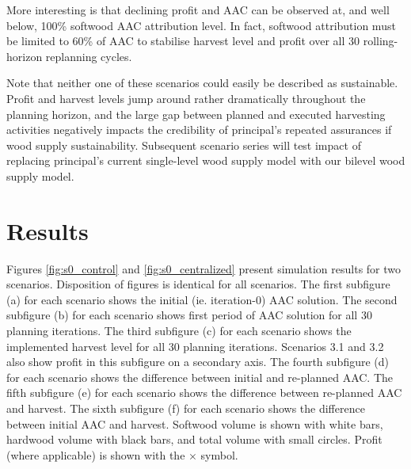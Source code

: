 More interesting is that declining profit and AAC can be observed at, and well below, 100\% softwood AAC attribution level. 
In fact, softwood attribution must be limited to 60\% of AAC to stabilise harvest level and profit over all 30 rolling-horizon replanning cycles.

Note that neither one of these scenarios could easily be described as sustainable. Profit and harvest levels jump around rather dramatically throughout the planning horizon, and the large gap between planned and executed harvesting activities negatively impacts the credibility of principal's repeated assurances if wood supply sustainability. Subsequent scenario series will test impact of replacing principal's current single-level wood supply model with our bilevel wood supply model. 

\section{Results}

Figures \ref{fig:s0_control} and \ref{fig:s0_centralized} present
simulation results for two scenarios. %
Disposition of figures is identical for all scenarios. The
first subfigure (a) for each scenario shows the initial
(ie. iteration-0) AAC solution. The second subfigure (b) for each
scenario shows first period of AAC solution for all 30 planning
iterations. The third subfigure (c) for each scenario shows the
implemented harvest level for all 30 planning iterations. Scenarios
3.1 and 3.2 also show profit in this subfigure on a secondary
axis. The fourth subfigure (d) for each scenario shows the difference
between initial and re-planned AAC. The fifth subfigure (e) for each
scenario shows the difference between re-planned AAC and harvest.  The
sixth subfigure (f) for each scenario shows the difference between
initial AAC and harvest. Softwood volume is shown with white bars,
hardwood volume with black bars, and total volume with small
circles. Profit (where applicable) is shown with the $\times$
symbol. 


